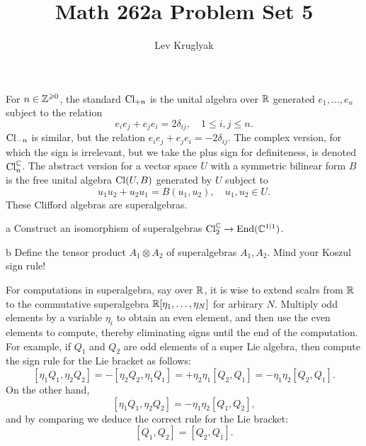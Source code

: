 \documentclass{pset}
\title{Math 262a Problem Set 5}
\author{Lev Kruglyak}
\begin{document}
\maketitle

%
%
%
\begin{problem}{2}
  For $n\in \mathbb{Z}^{\geqslant 0}$, the standard $\mathrm{Cl}_{+n}$ is the unital algebra over $\mathbb{R}$ generated $e_1,\ldots, e_n$ subject to the relation 
  \[e_i e_j + e_je_i = 2\delta_{ij},\quad 1\leq i, j \leq n.\]
  $\mathrm{Cl}_{-n}$ is similar, but the relation $e_ie_j + e_je_i = -2\delta_{ij}$. The complex version, for which the sign is irrelevant, but we take the plus sign for definiteness, is denoted $\mathrm{Cl}_n^{\mathbb{C}}$. The abstract version for a vector space $U$ with a symmetric bilinear form $B$ is the free unital algebra $\mathrm{Cl}(U, B)$ generated by $U$ subject to 
  \[u_1u_2 + u_2u_1 = B(u_1, u_2), \quad u_1, u_2\in U.\]
  These Clifford algebras are superalgebras.
\end{problem}

\begin{parts}
  \begin{part}{a}
    Construct an isomorphism of superalgebras $\mathrm{Cl}^{\mathbb{C}}_2 \to \textrm{End}(\mathbb{C}^{1|1})$.
  \end{part}
  
  \begin{part}{b}
    Define the tensor product $A_1\otimes A_2$ of superalgebras $A_1, A_2$. Mind your Koszul sign rule!
  \end{part}
\end{parts}

\begin{problem}{3}
  For computations in superalgebra, say over $\mathbb{R}$, it is wise to extend scalrs from $\mathbb{R}$ to the commutative superalgebra $\mathbb{R}[\eta_1,\ldots, \eta_N]$ for arbirary $N$. Multiply odd elements by a variable $\eta_i$ to obtain an even element, and then use the even elements to compute, thereby eliminating signs until the end of the computation. For example, if $Q_1$ and $Q_2$ are odd elements of a super Lie algebra, then compute the sign rule for the Lie bracket as follows:
  \[
    [\eta_1 Q_1, \eta_2 Q_2] = -[\eta_2 Q_2, \eta_1 Q_1] = +\eta_2\eta_1 [Q_2, Q_1] = -\eta_1\eta_2[Q_2, Q_1].
  \]
  On the other hand,
  \[
    [\eta_1 Q_1, \eta_2 Q_2] = -\eta_1\eta_2[Q_1, Q_2],
  \]
  and by comparing we deduce the correct rule for the Lie bracket:
  \[
    [Q_1, Q_2] = [Q_2, Q_1].
  \]
\end{problem}
\end{document}
